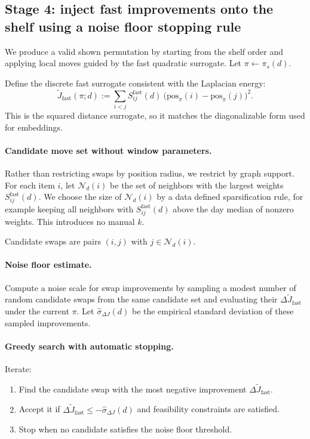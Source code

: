 \documentclass[11pt]{article}
\begin{document}
\subsection{Stage 4: inject fast improvements onto the shelf using a noise floor stopping rule}
We produce a valid shown permutation by starting from the shelf order and applying local moves guided by the fast quadratic surrogate.
Let $\pi\gets\pi_s(d)$.

Define the discrete fast surrogate consistent with the Laplacian energy:
\[
\widetilde{J}_{\text{fast}}(\pi;d) := \sum_{i<j} S^{\text{fast}}_{ij}(d)\ \big(\mathrm{pos}_{\pi}(i)-\mathrm{pos}_{\pi}(j)\big)^2.
\]
This is the squared distance surrogate, so it matches the diagonalizable form used for embeddings.

\paragraph{Candidate move set without window parameters.}
Rather than restricting swaps by position radius, we restrict by graph support.
For each item $i$, let $\mathcal{N}_d(i)$ be the set of neighbors with the largest weights $S^{\text{fast}}_{ij}(d)$.
We choose the size of $\mathcal{N}_d(i)$ by a data defined sparsification rule, for example keeping all neighbors with $S^{\text{fast}}_{ij}(d)$ above the day median of nonzero weights.
This introduces no manual $k$.

Candidate swaps are pairs $(i,j)$ with $j\in\mathcal{N}_d(i)$.

\paragraph{Noise floor estimate.}
Compute a noise scale for swap improvements by sampling a modest number of random candidate swaps from the same candidate set and evaluating their $\Delta \widetilde{J}_{\text{fast}}$ under the current $\pi$.
Let $\widehat{\sigma}_{\Delta J}(d)$ be the empirical standard deviation of these sampled improvements.

\paragraph{Greedy search with automatic stopping.}
Iterate:
\begin{enumerate}
\item Find the candidate swap with the most negative improvement $\Delta \widetilde{J}_{\text{fast}}$.
\item Accept it if $\Delta \widetilde{J}_{\text{fast}} \le -\widehat{\sigma}_{\Delta J}(d)$ and feasibility constraints are satisfied.
\item Stop when no candidate satisfies the noise floor threshold.
\end{enumerate}
\end{document}
